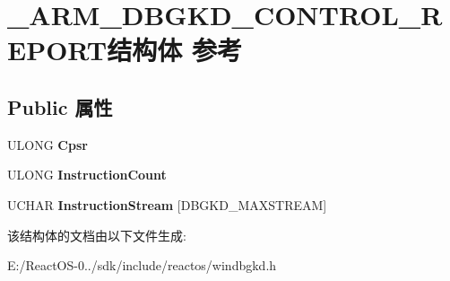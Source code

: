 \hypertarget{struct___a_r_m___d_b_g_k_d___c_o_n_t_r_o_l___r_e_p_o_r_t}{}\section{\+\_\+\+A\+R\+M\+\_\+\+D\+B\+G\+K\+D\+\_\+\+C\+O\+N\+T\+R\+O\+L\+\_\+\+R\+E\+P\+O\+R\+T结构体 参考}
\label{struct___a_r_m___d_b_g_k_d___c_o_n_t_r_o_l___r_e_p_o_r_t}
\subsection*{Public 属性}
\begin{DoxyCompactItemize}
\item 
\mbox{\label{struct___a_r_m___d_b_g_k_d___c_o_n_t_r_o_l___r_e_p_o_r_t_a6c7cc3e9f845d0a011548e35c6c1fee1}} 
U\+L\+O\+NG {\bfseries Cpsr}
\item 
\mbox{\label{struct___a_r_m___d_b_g_k_d___c_o_n_t_r_o_l___r_e_p_o_r_t_a5a225772946f270439a6a0bc72aee28c}} 
U\+L\+O\+NG {\bfseries Instruction\+Count}
\item 
\mbox{\label{struct___a_r_m___d_b_g_k_d___c_o_n_t_r_o_l___r_e_p_o_r_t_ad82406386a72a3818554d827986a25c7}} 
U\+C\+H\+AR {\bfseries Instruction\+Stream} \mbox{[}D\+B\+G\+K\+D\+\_\+\+M\+A\+X\+S\+T\+R\+E\+AM\mbox{]}
\end{DoxyCompactItemize}


该结构体的文档由以下文件生成\+:\begin{DoxyCompactItemize}
\item 
E\+:/\+React\+O\+S-\/0../sdk/include/reactos/windbgkd.\+h\end{DoxyCompactItemize}
